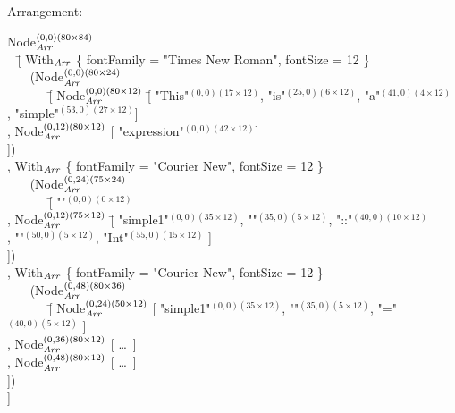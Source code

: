 \documentclass{speauth}
\begin{document}
Arrangement:
\small \ttfamily
\begin{tabbing}
Node$_{\mathit{Arr}}^{(0,0)(80\times84)}$ \\
~ \= [ With$_{\mathit{Arr}}$ \{ fontFamily = "Times New Roman", fontSize = 12 \}\\
      \> ~~~ (Node$_{\mathit{Arr}}^{(0,0)(80\times24)}$ \\
      \> ~~~~~~ \= [ Node$_{\mathit{Arr}}^{(0,0)(80\times12)}$ \= [ "This"$^{(0,0)(17\times12)}$, "is"$^{(25,0)(6\times12)}$, "a"$^{(41,0)(4\times12)}$ \\
      \>       \>                                                      \>, "simple"$^{(53,0)(27\times12)}$]\\
      \>       \> , Node$_{\mathit{Arr}}^{(0,12)(80\times12)}$  [ "expression"$^{(0,0)(42\times12)}$]\\
      \>       \> ])\\
                    
      \> , With$_{\mathit{Arr}}$ \{ fontFamily = "Courier New",  fontSize = 12 \}\\
      \> ~~~ (Node$_{\mathit{Arr}}^{(0,24)(75\times24)}$\\
      \> ~~~~~~ \= [ ""$^{(0,0)(0\times12)}$\\
      \>      \> , Node$_{\mathit{Arr}}^{(0,12)(75\times12)}$ \= [ "simple1"$^{(0,0)(35\times12)}$, "\textvisiblespace"$^{(35,0)(5\times12)}$, "::"$^{(40,0)(10\times12)}$\\
      \>      \>                                                      \> , "\textvisiblespace"$^{(50,0)(5\times12)}$, "Int"$^{(55,0)(15\times12)}$ ]\\

      \>      \>  ])\\
                    
      \> , With$_{\mathit{Arr}}$ \{ fontFamily = "Courier New",  fontSize = 12 \}\\
      \> ~~~ (Node$_{\mathit{Arr}}^{(0,48)(80\times36)}$\\
      \> ~~~~~~ \= [  Node$_{\mathit{Arr}}^{(0,24)(50\times12)}$ [ "simple1"$^{(0,0)(35\times12)}$, "\textvisiblespace"$^{(35,0)(5\times12)}$, "="$^{(40,0)(5\times12)}$ ]\\
      \>      \> , Node$_{\mathit{Arr}}^{(0,36)(80\times12)}$ [ \dots~]\\
      \>      \> , Node$_{\mathit{Arr}}^{(0,48)(80\times12)}$ [ \dots~]\\
      \>      \> ])\\
      \> ]

\end{tabbing}
\rmfamily \normalsize
\end{document}
